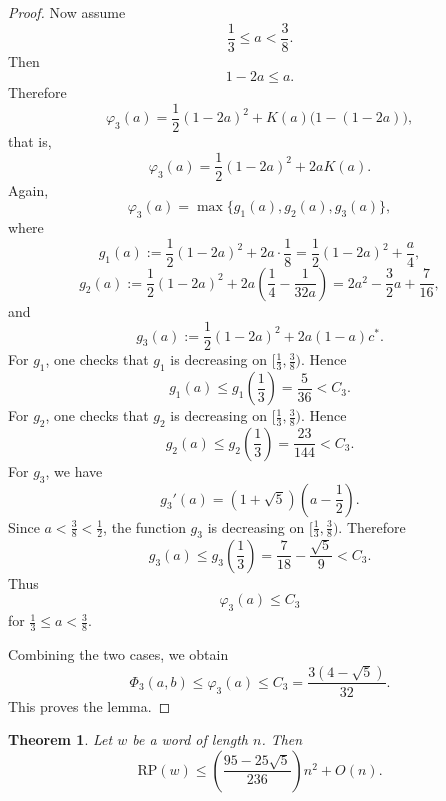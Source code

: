 \documentclass[runningheads,envcountsame,a4paper]{llncs}
\newtheorem{thm}{Theorem}
\newcommand{\rp}{\mathrm{RP}}
\begin{document}
\begin{proof}
Now assume
\[
\frac13\leq a<\frac38.
\]
Then
\[
1-2a\leq a.
\]
Therefore
\[
\varphi_3(a)
=
\frac12(1-2a)^2+K(a)\bigl(1-(1-2a)\bigr),
\]
that is,
\[
\varphi_3(a)=\frac12(1-2a)^2+2aK(a).
\]
Again,
\[
\varphi_3(a)=\max\{g_1(a),g_2(a),g_3(a)\},
\]
where
\[
g_1(a):=
\frac12(1-2a)^2+2a\cdot\frac18
=
\frac12(1-2a)^2+\frac a4,
\]
\[
g_2(a):=
\frac12(1-2a)^2+
2a\left(\frac14-\frac1{32a}\right)
=
2a^2-\frac32a+\frac7{16},
\]
and
\[
g_3(a):=
\frac12(1-2a)^2+2a(1-a)c^*.
\]
For \(g_1\), one checks that \(g_1\) is decreasing on
\([\frac13,\frac38)\). Hence
\[
g_1(a)\leq g_1\left(\frac13\right)=\frac5{36}<C_3.
\]
For \(g_2\), one checks that \(g_2\) is decreasing on
\([\frac13,\frac38)\). Hence
\[
g_2(a)\leq g_2\left(\frac13\right)=\frac{23}{144}<C_3.
\]
For \(g_3\), we have
\[
g_3'(a)
=
(1+\sqrt5)\left(a-\frac12\right).
\]
Since \(a<\frac38<\frac12\), the function \(g_3\) is decreasing on
\([\frac13,\frac38)\). Therefore
\[
g_3(a)\leq g_3\left(\frac13\right)
=
\frac7{18}-\frac{\sqrt5}{9}
<C_3.
\]
Thus
\[
\varphi_3(a)\leq C_3
\]
for \(\frac13\leq a<\frac38\).

Combining the two cases, we obtain
\[
\Phi_3(a,b)\leq \varphi_3(a)\leq C_3
=
\frac{3(4-\sqrt5)}{32}.
\]
This proves the lemma.
\end{proof}

























\begin{thm}\label{thm:rp-upper-bound}
Let \(w\) be a word of length \(n\). Then
\[
        \rp(w)\le
        \left(\frac{95-25\sqrt5}{236}\right)n^2+O(n).
\]
\end{thm}
\end{document}
